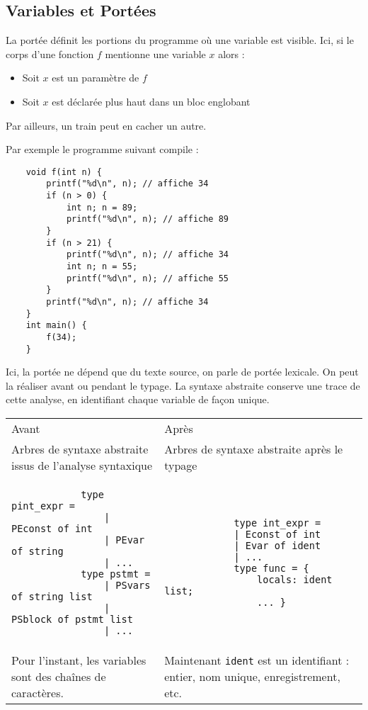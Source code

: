 \documentclass{cours}
\begin{document}
\subsection{Variables et Portées}
\begin{definition}
    La portée définit les portions du programme où une variable est visible. Ici, si le corps d'une fonction $f$ mentionne une variable $x$ alors :
    \begin{itemize}
        \item Soit $x$ est un paramètre de $f$
        \item Soit $x$ est déclarée plus haut dans un bloc englobant
    \end{itemize}
    Par ailleurs, un train peut en cacher un autre.
\end{definition}

Par exemple le programme suivant compile : 
\begin{verbatim}
    void f(int n) {
        printf("%d\n", n); // affiche 34
        if (n > 0) {
            int n; n = 89;
            printf("%d\n", n); // affiche 89
        }
        if (n > 21) {
            printf("%d\n", n); // affiche 34
            int n; n = 55;
            printf("%d\n", n); // affiche 55
        }
        printf("%d\n", n); // affiche 34
    }
    int main() {
        f(34);
    }
\end{verbatim}
Ici, la portée ne dépend que du texte source, on parle de portée lexicale. On peut la réaliser avant ou pendant le typage. La syntaxe abstraite conserve une trace de cette analyse, en identifiant chaque variable de façon unique. 
\begin{center}
    \begin{tabular}{p{.4\linewidth}p{.4\linewidth}}
        Avant & Après\\
        Arbres de syntaxe abstraite issus de l'analyse syntaxique & Arbres de syntaxe abstraite après le typage\\
        \begin{verbatim}
            type pint_expr =
                | PEconst of int
                | PEvar of string
                | ...
            type pstmt =
                | PSvars of string list
                | PSblock of pstmt list
                | ...
        \end{verbatim}
        & 
        \begin{verbatim}
            type int_expr =
            | Econst of int
            | Evar of ident
            | ...
            type func = {
                locals: ident list;
                ... }
        \end{verbatim}
        \\
        Pour l'instant, les variables sont des chaînes de caractères. & Maintenant \texttt{ident} est un identifiant : entier, nom unique, enregistrement, etc.
    \end{tabular}
\end{center}
\end{document}
